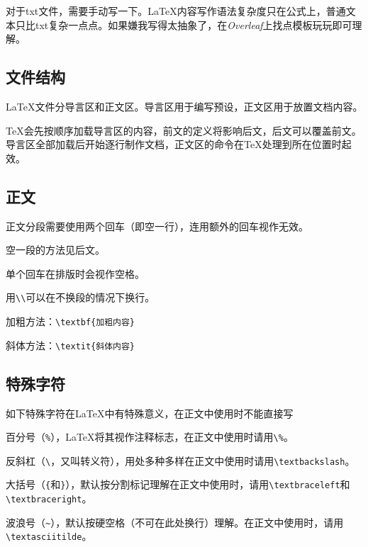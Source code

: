 \documentclass[10pt,openany]{book}
\begin{document}
对于txt文件，需要手动写一下。{\LaTeX}内容写作语法复杂度只在公式上，普通文本只比txt复杂一点点。如果嫌我写得太抽象了，在\textit{Overleaf}上找点模板玩玩即可理解。

\subsection{文件结构}

{\LaTeX}文件分导言区和正文区。导言区用于编写预设，正文区用于放置文档内容。



{\TeX}会先按顺序加载导言区的内容，前文的定义将影响后文，后文可以覆盖前文。导言区全部加载后开始逐行制作文档，正文区的命令在{\TeX}处理到所在位置时起效。

\subsection{正文}

正文分段需要使用两个回车（即空一行），连用额外的回车视作无效。

空一段的方法见后文\textit{}。

单个回车在排版时会视作空格。

用\texttt{\textbackslash{}\textbackslash{}}可以在不换段的情况下换行。

加粗方法：\texttt{\textbackslash{}textbf\{加粗内容\}}

斜体方法：\texttt{\textbackslash{}textit\{斜体内容\}}

\subsection{特殊字符}

如下特殊字符在{\LaTeX}中有特殊意义，在正文中使用时不能直接写

百分号（\texttt{\%}），{\LaTeX}将其视作注释标志，在正文中使用时请用\texttt{\textbackslash{}\%}。

反斜杠（\texttt{\textbackslash{}}，又叫转义符），用处多种多样在正文中使用时请用\texttt{\textbackslash{}textbackslash}。

大括号（\texttt{\{}和\texttt{\}}），默认按分割标记理解在正文中使用时，请用\texttt{\textbackslash{}textbraceleft}和\texttt{\textbackslash{}textbraceright}。

波浪号（\texttt{\textasciitilde{}}），默认按硬空格（不可在此处换行）理解。在正文中使用时，请用\texttt{\textbackslash{}textasciitilde}。
\end{document}
